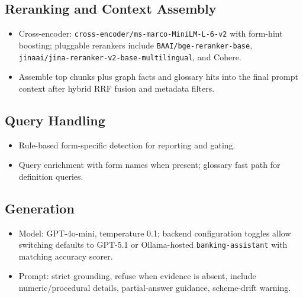 \documentclass[11pt,a4paper]{article}
\begin{document}
\subsection{Reranking and Context Assembly}
\begin{itemize}[leftmargin=1.2cm]
    \item Cross-encoder: \texttt{cross-encoder/ms-marco-MiniLM-L-6-v2} with form-hint boosting; pluggable rerankers include \texttt{BAAI/bge-reranker-base}, \texttt{jinaai/jina-reranker-v2-base-multilingual}, and Cohere.
    \item Assemble top chunks plus graph facts and glossary hits into the final prompt context after hybrid RRF fusion and metadata filters.
\end{itemize}

\subsection{Query Handling}
\begin{itemize}[leftmargin=1.2cm]
    \item Rule-based form-specific detection for reporting and gating.
    \item Query enrichment with form names when present; glossary fast path for definition queries.
\end{itemize}

\subsection{Generation}
\begin{itemize}[leftmargin=1.2cm]
    \item Model: GPT-4o-mini, temperature 0.1; backend configuration toggles allow switching defaults to GPT-5.1 or Ollama-hosted \texttt{banking-assistant} with matching accuracy scorer.
    \item Prompt: strict grounding, refuse when evidence is absent, include numeric/procedural details, partial-answer guidance, scheme-drift warning.
\end{itemize}
\end{document}
